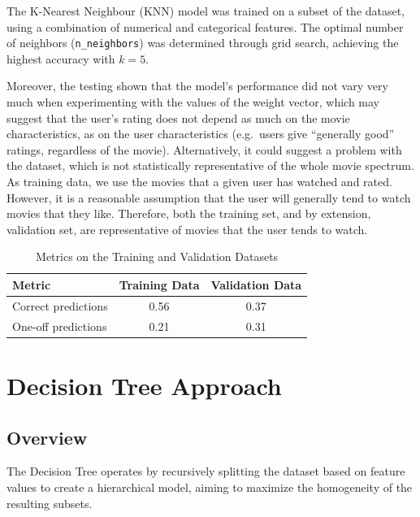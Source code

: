 \documentclass[a4paper,9pt]{article}
\begin{document}
The K-Nearest Neighbour (KNN) model was trained on a subset of the dataset, using a combination of numerical and categorical features. The optimal number of neighbors (\texttt{n\_neighbors}) was determined through grid search, achieving the highest accuracy with \( k = 5 \).

Moreover, the testing shown that the model's performance did not vary very much when experimenting with the values of the weight vector, which may suggest that the user's rating does not depend as much on the movie characteristics, as on the user characteristics (e.g.~users give ``generally good'' ratings, regardless of the movie).
Alternatively, it could suggest a problem with the dataset, which is not statistically representative of the whole movie spectrum. As training data, we use the movies that a given user has watched and rated. However, it is a reasonable assumption that the user will generally tend to watch movies that they like. Therefore, both the training set, and by extension, validation set, are representative of movies that the user tends to watch.

\begin{table}[h]
	\centering
	\begin{tabular}{|l|c|c|}
		\hline
		\textbf{Metric}     & \textbf{Training Data} & \textbf{Validation Data} \\ \hline
		Correct predictions & 0.56                   & 0.37                     \\ \hline
		One-off predictions & 0.21                   & 0.31                     \\ \hline
	\end{tabular}
	\caption{Metrics on the Training and Validation Datasets}
	\label{tab:metrics}
\end{table}

\clearpage
\section{Decision Tree Approach}
\subsection{Overview}

The Decision Tree operates by recursively splitting the dataset based on feature values to create
a hierarchical model, aiming to maximize the homogeneity of the resulting subsets.
\end{document}
